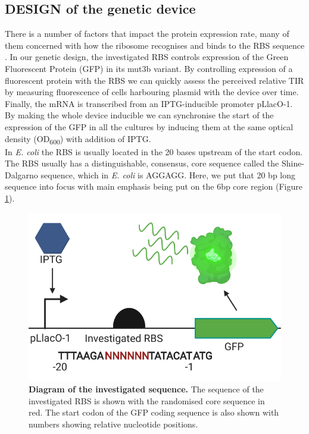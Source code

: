 \documentclass{article}
\begin{document}
\subsection{DESIGN of the genetic device}
There is a number of factors that impact the protein expression rate, many of them concerned with how the ribosome recognises and binds to the RBS sequence \cite{Chen1994,Vellanoweth1992,SHULTZABERGER2001}.
In our genetic design, the investigated RBS controls expression of the Green Fluorescent Protein (GFP) in its mut3b variant. 
By controlling expression of a fluorescent protein with the RBS we can quickly assess the perceived relative TIR by measuring fluorescence of cells harbouring plasmid with the device over time.
Finally, the mRNA is transcribed from an IPTG-inducible promoter pLlacO-1. 
By making the whole device inducible we can synchronise the start of the expression of the GFP in all the cultures by inducing them at the same optical density (OD\textsubscript{600}) with addition of IPTG.\\
In \emph{E. coli} the RBS is usually located in the 20 bases upstream of the start codon. 
The RBS usually has a distinguishable, consensus, core sequence called the Shine-Dalgarno sequence, which in \emph{E. coli} is AGGAGG. 
Here, we put that 20 bp long sequence into focus with main emphasis being put on the 6bp core region (Figure \ref{fig:Anatomy}).\\

\begin{figure}[h]
    \centering
    \includegraphics[scale=0.6]{plots/RBS_anatomy.pdf}
    \caption{\textbf{Diagram of the investigated sequence.} The sequence of the investigated RBS is shown with the randomised core sequence in red. The start codon of the GFP coding sequence is also shown with numbers showing relative nucleotide positions.}
    \label{fig:Anatomy}
\end{figure}
\end{document}
